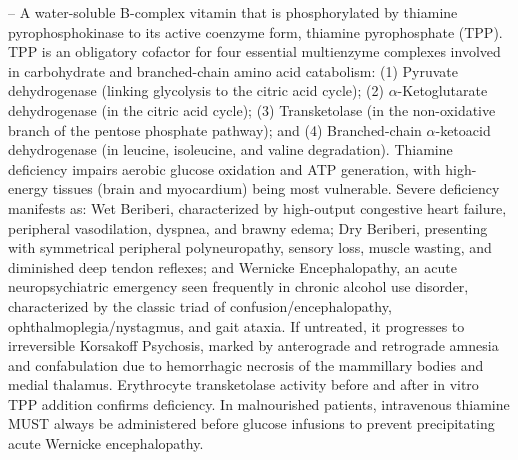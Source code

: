 -- A water-soluble B-complex vitamin that is phosphorylated by thiamine pyrophosphokinase to its active coenzyme form, thiamine pyrophosphate (TPP). TPP is an obligatory cofactor for four essential multienzyme complexes involved in carbohydrate and branched-chain amino acid catabolism: (1) Pyruvate dehydrogenase (linking glycolysis to the citric acid cycle); (2) $\alpha$-Ketoglutarate dehydrogenase (in the citric acid cycle); (3) Transketolase (in the non-oxidative branch of the pentose phosphate pathway); and (4) Branched-chain $\alpha$-ketoacid dehydrogenase (in leucine, isoleucine, and valine degradation). Thiamine deficiency impairs aerobic glucose oxidation and ATP generation, with high-energy tissues (brain and myocardium) being most vulnerable. Severe deficiency manifests as: Wet Beriberi, characterized by high-output congestive heart failure, peripheral vasodilation, dyspnea, and brawny edema; Dry Beriberi, presenting with symmetrical peripheral polyneuropathy, sensory loss, muscle wasting, and diminished deep tendon reflexes; and Wernicke Encephalopathy, an acute neuropsychiatric emergency seen frequently in chronic alcohol use disorder, characterized by the classic triad of confusion/encephalopathy, ophthalmoplegia/nystagmus, and gait ataxia. If untreated, it progresses to irreversible Korsakoff Psychosis, marked by anterograde and retrograde amnesia and confabulation due to hemorrhagic necrosis of the mammillary bodies and medial thalamus. Erythrocyte transketolase activity before and after in vitro TPP addition confirms deficiency. In malnourished patients, intravenous thiamine MUST always be administered before glucose infusions to prevent precipitating acute Wernicke encephalopathy.

